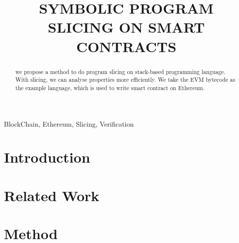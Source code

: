 \documentclass{article}
\title{SYMBOLIC PROGRAM SLICING ON SMART CONTRACTS}
\begin{document}
%

\maketitle

%

\begin{abstract}

  we propose a method to do program slicing on stack-based programming language. With slicing, we can analyse properties more efficiently. We take the EVM bytecode\cite{wood2014ethereum} as the example language, which is used to write smart contract\cite{szabo2003advances} on Ethereum\cite{wood2014ethereum}.

\end{abstract}

\begin{keywords}
BlockChain, Ethereum, Slicing, Verification
\end{keywords}


\section{Introduction}
\label{sec:introduction}

\section{Related Work}
\label{sec:relatedwork}

\section{Method}
\label{sec:method}
\end{document}
